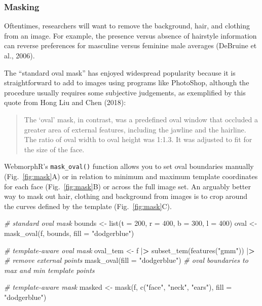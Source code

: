 \documentclass[
  doc,floatsintext]{apa6}
\newenvironment{Shaded}{\begin{snugshade}}{\end{snugshade}}
\newcommand{\AttributeTok}[1]{\textcolor[rgb]{0.77,0.63,0.00}{#1}}
\newcommand{\CommentTok}[1]{\textcolor[rgb]{0.56,0.35,0.01}{\textit{#1}}}
\newcommand{\DecValTok}[1]{\textcolor[rgb]{0.00,0.00,0.81}{#1}}
\newcommand{\ErrorTok}[1]{\textcolor[rgb]{0.64,0.00,0.00}{\textbf{#1}}}
\newcommand{\FunctionTok}[1]{\textcolor[rgb]{0.00,0.00,0.00}{#1}}
\newcommand{\NormalTok}[1]{#1}
\newcommand{\OtherTok}[1]{\textcolor[rgb]{0.56,0.35,0.01}{#1}}
\newcommand{\SpecialCharTok}[1]{\textcolor[rgb]{0.00,0.00,0.00}{#1}}
\newcommand{\StringTok}[1]{\textcolor[rgb]{0.31,0.60,0.02}{#1}}
\begin{document}
\hypertarget{masking}{%
\subsubsection{Masking}\label{masking}}

Oftentimes, researchers will want to remove the background, hair, and clothing from an image. For example, the presence versus absence of hairstyle information can reverse preferences for masculine versus feminine male averages (DeBruine et al., 2006).

The ``standard oval mask'' has enjoyed widespread popularity because it is straightforward to add to images using programs like PhotoShop, although the procedure usually requires some subjective judgements, as exemplified by this quote from Hong Liu and Chen (2018):

\begin{quote}
The `oval' mask, in contrast, was a predefined oval window that occluded a greater area of external features, including the jawline and the hairline. The ratio of oval width to oval height was 1:1.3. It was adjusted to fit for the size of the face.
\end{quote}

WebmorphR's \texttt{mask\_oval()} function allows you to set oval boundaries manually (Fig.~\ref{fig:mask}A) or in relation to minimum and maximum template coordinates for each face (Fig.~\ref{fig:mask}B) or across the full image set. An arguably better way to mask out hair, clothing and background from images is to crop around the curves defined by the template (Fig.~\ref{fig:mask}C).

\begin{Shaded}
\begin{Highlighting}[]
\CommentTok{\# standard oval mask}
\NormalTok{bounds }\OtherTok{\textless{}{-}} \FunctionTok{list}\NormalTok{(}\AttributeTok{t =} \DecValTok{200}\NormalTok{, }\AttributeTok{r =} \DecValTok{400}\NormalTok{, }\AttributeTok{b =} \DecValTok{300}\NormalTok{, }\AttributeTok{l =} \DecValTok{400}\NormalTok{)}
\NormalTok{oval }\OtherTok{\textless{}{-}} \FunctionTok{mask\_oval}\NormalTok{(f, bounds, }\AttributeTok{fill =} \StringTok{"dodgerblue"}\NormalTok{)}

\CommentTok{\# template{-}aware oval mask}
\NormalTok{oval\_tem }\OtherTok{\textless{}{-}}\NormalTok{ f }\SpecialCharTok{|}\ErrorTok{\textgreater{}}
  \FunctionTok{subset\_tem}\NormalTok{(}\FunctionTok{features}\NormalTok{(}\StringTok{"gmm"}\NormalTok{)) }\SpecialCharTok{|}\ErrorTok{\textgreater{}} \CommentTok{\# remove external points}
  \FunctionTok{mask\_oval}\NormalTok{(}\AttributeTok{fill =} \StringTok{"dodgerblue"}\NormalTok{) }\CommentTok{\# oval boundaries to max and min template points}

\CommentTok{\# template{-}aware mask}
\NormalTok{masked }\OtherTok{\textless{}{-}} \FunctionTok{mask}\NormalTok{(f, }\FunctionTok{c}\NormalTok{(}\StringTok{"face"}\NormalTok{, }\StringTok{"neck"}\NormalTok{, }\StringTok{"ears"}\NormalTok{), }\AttributeTok{fill =} \StringTok{"dodgerblue"}\NormalTok{)}
\end{Highlighting}
\end{Shaded}
\end{document}
